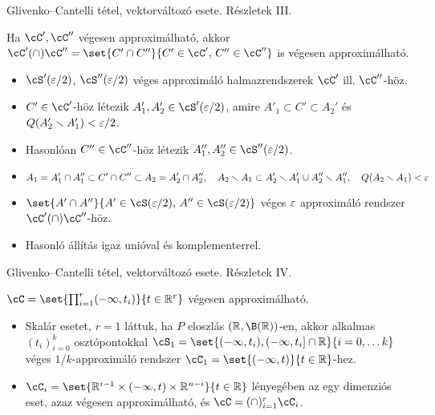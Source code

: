 \documentclass[aspectratio=169,notheorems,9pt,\option]{beamer}
\begin{document}
\begin{frame}{Glivenko--Cantelli tétel, vektorváltozó esete. Részletek III.}
  \begin{proposition}
    Ha $\cC',\cC''$ végesen approximálható, akkor
    $\cC' (\cap)\cC''=\set{C'\cap C''}{C'\in\cC',\,C''\in\cC''}$
    is végesen approximálható.
  \end{proposition}

  \begin{itemize}
  \item $\cS' (\eps/2)$, $\cS'' (\eps/2)$ véges approximáló
    halmazrendszerek $\cC'$ ill. $\cC''$-höz.
  \item $C'\in\cC'$-höz létezik $A'_1,A_2'\in\cS' (\eps/2)$, amire
    $A'_1\subset C'\subset A_2'$ és $Q (A_2'\smallsetminus A_1')<\varepsilon/2$.
  \item Hasonlóan $C''\in\cC''$-höz létezik $A''_1,A_2''\in\cS''
    (\eps/2)$.
  \item
    \begin{displaymath}
      A_1=A_1'\cap A_1''\subset C'\cap C''\subset A_2=A_2'\cap A_2'',\quad
      A_2\smallsetminus A_1\subset A_2'\smallsetminus A_1' \cup  A_2''\smallsetminus
      A_1'',\quad
      Q (A_2\smallsetminus A_1)<\varepsilon
    \end{displaymath}
  \item $\set{A'\cap A''}{A'\in\cS (\eps/2),\,A''\in\cS (\eps/2)}$
    véges $\varepsilon$ approximáló rendszer $\cC' (\cap)\cC''$-höz.
  \item Hasonló állítás igaz unióval és komplementerrel.
  \end{itemize}

\end{frame}

\begin{frame}{Glivenko--Cantelli tétel, vektorváltozó esete. Részletek IV.}
  \begin{proposition}
    $\cC=\set{\prod_{i=1}^r (-\infty,t_i)}{t\in\real^{r}}$ végesen approximálható.
  \end{proposition}
  \begin{itemize}
  \item Skalár esetet, $r=1$ láttuk, ha $P$ eloszlás $(\real,\B(\real))$-en, akkor alkalmas $(t_i)_{i=0}^{k}$ osztópontokkal
   $\cS_1=\set{(-\infty,t_i),(-\infty,t_i]\cap\real}{i=0,\dots k}$ véges $1/k$-approximáló rendszer 
   $\cC_1=\set{(-\infty,t)}{t\in\real}$-hez.
  \item $\cC_i=\set{\real^{i-1}\times (-\infty,t)\times\real^{n-i}}{t\in\real}$ 
  lényegében az egy dimenziós eset, azaz végesen approximálható, és $\cC=(\cap)_{i=1}^r \cC_i$.
  \end{itemize}
\end{frame}
\end{document}
